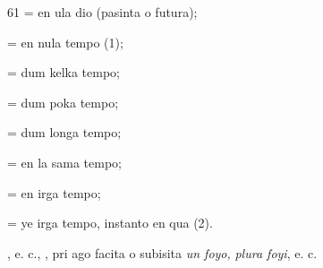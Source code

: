 \begin{VUpage}[65]{61}
 = en ula dio (pasinta o futura);

 = en nula tempo (1);

 = dum kelka tempo;

 = dum poka tempo;

 = dum longa tempo;

 = en la sama tempo;

 = en irga tempo;

 = ye irga tempo, instanto en qua (2).

\VUblancAlinea
{}, e. c., \cc
{}, pri ago facita o subisita \textit{un foyo,}\nl
\textit{plura foyi}, e. c.

\parplein
\end{VUpage}


